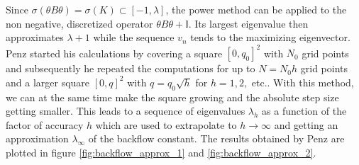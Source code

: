 	Since $\sigma(\theta B \theta)=\sigma(K)\subset[-1,\lambda]$, the power method can be applied to the non negative, discretized operator $\theta B\theta+\mathbb{I}$. Its largest eigenvalue then approximates $\lambda +1$ while the sequence $v_n$ tends to the maximizing eigenvector.\\
	Penz started his calculations by covering a square $[0,q_0]^2$ with $N_0$ grid points and subsequently he repeated the computations for up to $N=N_0h$ grid points and a larger square $ [0,q]^2$ with $q=q_0\sqrt{h}$ for $h=1,2,$ etc.. With this method, we can at the same time make the square growing and the absolute step size getting smaller. This leads to a sequence of eigenvalues $\lambda_h$ as a function of the factor of accuracy $h$ which are used to extrapolate to $h\to\infty$ and getting an approximation $\lambda_\infty$ of the backflow constant. The results obtained by Penz are plotted in figure \ref{fig:backflow_approx_1} and \ref{fig:backflow_approx_2}.\\
